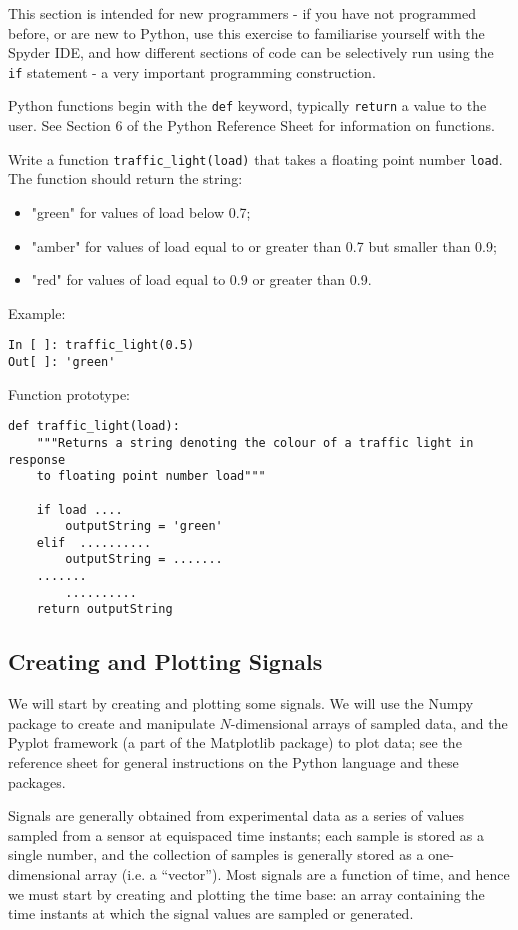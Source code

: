 This section is intended for new programmers - if you have not programmed before, or are new to Python, use this exercise to familiarise yourself with the Spyder IDE, and how different sections of code can be selectively run using the {\tt if} statement - a very important programming construction.

Python functions begin with the {\tt def} keyword, typically {\tt return} a value to the user.  See Section 6 of the Python Reference Sheet for information on functions. 

Write a function {\tt traffic\_light(load)} that takes a floating point number {\tt load}. The function should return the string:

\begin{itemize}
	\item "green" for values of load below 0.7;
	\item "amber" for values of load equal to or greater than 0.7 but smaller than 0.9;
	\item "red" for values of load equal to 0.9 or greater than 0.9.
\end{itemize}

Example:

\begin{lstlisting}[frame=single]
In [ ]: traffic_light(0.5)
Out[ ]: 'green'
\end{lstlisting}

Function prototype:

\begin{lstlisting}[frame=single]
def traffic_light(load):
	"""Returns a string denoting the colour of a traffic light in response
	to floating point number load"""

	if load ....
		outputString = 'green'
	elif  ..........
		outputString = .......
	.......
		..........
	return outputString
\end{lstlisting}

\subsection{Creating and Plotting Signals}

We will start by creating and plotting some signals. We will use the Numpy package to create and manipulate $N$-dimensional arrays of sampled data, and the Pyplot framework (a part of the Matplotlib package) to plot data; see the reference sheet for general instructions on the Python language and these packages.

Signals are generally obtained from experimental data as a series of values sampled from a sensor at equispaced time instants; each sample is stored as a single number, and the collection of samples is generally stored as a one-dimensional array (i.e. a ``vector''). Most signals are a function of time, and hence we must start by creating and plotting the time base: an array containing the time instants at which the signal values are sampled or generated.

